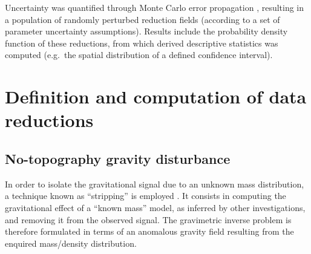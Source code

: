 Uncertainty was quantified through Monte Carlo error propagation \parencite{Aster2018}, resulting in a population of randomly perturbed reduction fields (according to a set of parameter uncertainty assumptions).
Results include the probability density function of these reductions, from which derived descriptive statistics was computed (e.g.~the spatial distribution of a defined confidence interval).


\section{Definition and computation of data reductions}
\label{s:SigIs:Defs}

\subsection{No-topography gravity disturbance}
\label{ss:SigIs:Defs:NETC}
In order to isolate the gravitational signal due to an unknown mass distribution, a technique known as ``stripping'' is employed \parencites{Vajda2008}{Tenzer2009}.
It consists in computing the gravitational effect of a ``known mass'' model, as inferred by other investigations, and removing it from the observed signal.
The gravimetric inverse problem is therefore formulated in terms of an anomalous gravity field resulting from the enquired mass/density distribution.

